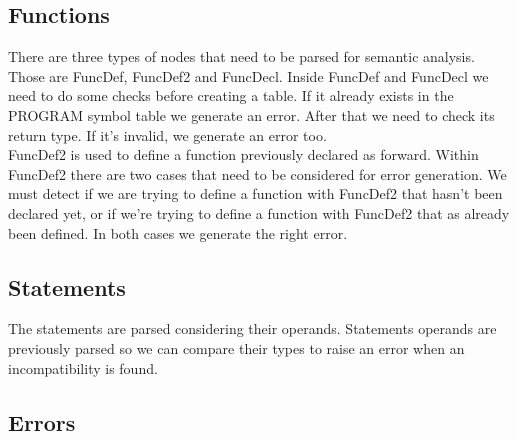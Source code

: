 \documentclass[12pt]{article}
\begin{document}
\subsection{Functions}
There are three types of nodes that need to be parsed for semantic analysis. Those are FuncDef, FuncDef2 and FuncDecl. Inside FuncDef and FuncDecl we need to do some checks before creating a table. If it already exists in the PROGRAM symbol table we generate an error. After that we need to check its return type. If it's invalid, we generate an error too. \\
FuncDef2 is used to define a function previously declared as forward. Within FuncDef2 there are two cases that need to be considered for error generation. We must detect if we are trying to define a function with FuncDef2 that hasn't been declared yet, or if we're trying to define a function with FuncDef2 that as already been defined. In both cases we generate the right error.

\subsection{Statements}
The statements are parsed considering their operands. Statements operands are previously parsed so we can compare their types to raise an error when an incompatibility is found.\\

\subsection{Errors}
\end{document}
